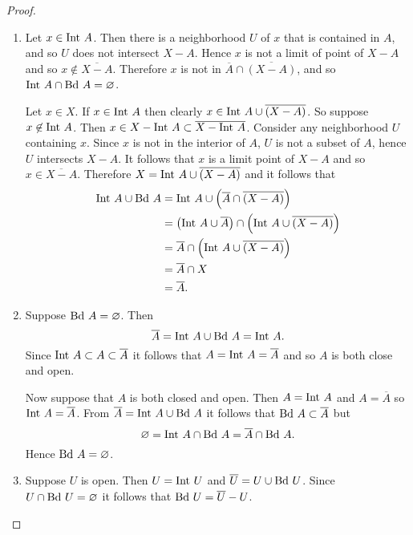 \begin{proof}
   ${}$
   \begin{enumerate}
       \item Let $x\in\text{Int } A$.  Then there is a neighborhood $U$ of $x$ that is contained in $A$, and so $U$ does not intersect $X-A$.
            Hence $x$ is not a limit of point of $X-A$ and so $x\not\in \overline{X-A}$. Therefore $x$ is not in $\overline{A}\cap\overline{\left(X-A\right)}$, and so $\text{Int } A\cap\text{Bd } A=\varnothing$.

            Let $x\in X$. If $x\in\text{Int } A$ then clearly $x\in\text{Int } A\cup \overline{\left(X-A\right)}$.
            So suppose $x\not\in\text{Int } A$. Then $x\in X-\text{Int } A\subset\overline{X-\text{Int } A}$.
            Consider any neighborhood $U$ containing $x$. Since $x$ is not in the interior of $A$, $U$ is not a subset of $A$, hence $U$ intersects $X-A$.
            It follows that $x$ is a limit point of $X-A$ and so $x\in\overline{X-A}$. Therefore $X=\text{Int } A\cup\overline{\left(X-A\right)}$ and it follows that
            \begin{align*}
                \text{Int } A\cup \text{Bd } A&=\text{Int } A\cup\left(\overline{A}\cap\overline{\left(X-A\right)}\right)\\
                &=\left(\text{Int } A\cup \overline{A}\right)\cap\left(\text{Int } A\cup\overline{\left(X-A\right)}\right)\\
                &=\overline{A}\cap\left(\text{Int } A\cup\overline{\left(X-A\right)}\right)\\
                &=\overline{A}\cap X\\
                &=\overline{A}.
            \end{align*}
        \item Suppose $\text{Bd } A=\varnothing$. Then 
                $$\overline{A}=\text{Int } A\cup\text{Bd } A=\text{Int } A.$$
            Since $\text{Int } A\subset A\subset\overline{A}$ it follows that $A=\text{Int } A=\overline{A}$ and so $A$ is both close and open.

            Now suppose that $A$ is both closed and open. Then $A=\text{Int } A$ and $A=\overline{A}$ so $\text{Int }{A}=\overline{A}$.
            From $\overline{A}=\text{Int } A\cup \text{Bd } A$ it follows that $\text{Bd } A\subset \overline{A}$ but 
                $$\varnothing=\text{Int } A\cap \text{Bd } A= \overline{A}\cap \text{Bd } A.$$
            Hence $\text{Bd } A=\varnothing$.
        \item Suppose $U$ is open. Then $U=\text{Int } U$ and $\overline{U}=U\cup \text{Bd } U$. Since $U\cap\text{Bd } U=\varnothing$ it follows that $\text{Bd } U =\overline{U}-U$.
        

\end{enumerate}
\end{proof}
